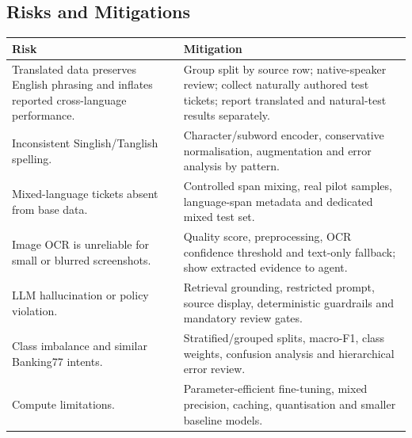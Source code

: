 \documentclass[10pt,letterpaper]{article}
\begin{document}
\subsection*{Risks and Mitigations}
\begin{table}[H]\centering\small
\begin{tabularx}{\textwidth}{|L{2.0in}|Y|}\hline
\textbf{Risk} & \textbf{Mitigation}\\\hline
Translated data preserves English phrasing and inflates reported cross-language performance. & Group split by source row; native-speaker review; collect naturally authored test tickets; report translated and natural-test results separately.\\\hline
Inconsistent Singlish/Tanglish spelling. & Character/subword encoder, conservative normalisation, augmentation and error analysis by pattern.\\\hline
Mixed-language tickets absent from base data. & Controlled span mixing, real pilot samples, language-span metadata and dedicated mixed test set.\\\hline
Image OCR is unreliable for small or blurred screenshots. & Quality score, preprocessing, OCR confidence threshold and text-only fallback; show extracted evidence to agent.\\\hline
LLM hallucination or policy violation. & Retrieval grounding, restricted prompt, source display, deterministic guardrails and mandatory review gates.\\\hline
Class imbalance and similar Banking77 intents. & Stratified/grouped splits, macro-F1, class weights, confusion analysis and hierarchical error review.\\\hline
Compute limitations. & Parameter-efficient fine-tuning, mixed precision, caching, quantisation and smaller baseline models.\\\hline
\end{tabularx}
\end{table}

\end{document}
